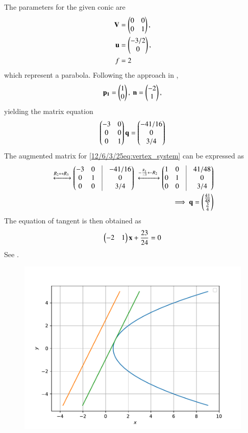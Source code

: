 The parameters for the given conic are
\begin{align}
	\label{12/6/3/25eq:V_matrix}
	\mathbf{V} &= \begin{pmatrix}0 & 0\\0 & 1\end{pmatrix},
	\\
	\label{12/6/3/25eq:u_vector}
	\mathbf{u} &= \begin{pmatrix}-3/2\\0\end{pmatrix},
	\\
	\label{12/6/3/25eq:f_value}
	f &= 2
\end{align}
which represent a parabola. 
Following the approach in 
,
   \begin{align}
     \mathbf{p_1} = \begin{pmatrix}1\\0\end{pmatrix},\
     \mathbf{n} = \begin{pmatrix}-2\\1\end{pmatrix},
    \end{align}
yielding the matrix equation
\begin{align}
	\label{12/6/3/25eq:vertex_system}
	\begin{pmatrix}-3&0\\0& 0\\0& 1\end{pmatrix}\mathbf{q} = \begin{pmatrix}-41/16\\0 \\3/4\end{pmatrix}\\
\end{align}
The augmented matrix for \eqref{12/6/3/25eq:vertex_system} can be expressed as
\begin{align*}
	\xleftrightarrow[]{R_2 \leftrightarrow R_3}\myvec{-3&0&\vrule&-41/16\\0&1&\vrule&0\\0&0&\vrule&3/4}
	\xleftrightarrow[]{-\frac{R_1}{-3} \leftarrow R_2}\myvec{1&0&\vrule&41/48\\0&1&\vrule&0\\0&0&\vrule&3/4}\\
	\implies\vec{q} = \myvec{\frac{41}{48}\\\frac{3}{4}}
\end{align*}
The equation of tangent is then obtained as
\begin{align}
	\begin{pmatrix}-2 & 1\end{pmatrix}\mathbf{x} +\frac{23}{24} = 0 
\end{align}
See  
		.
	\begin{figure}[!h]
		\centering
 \includegraphics[width=\columnwidth]{chapters/12/6/3/25/figs/conic.pdf}
		\caption{}
		\label{fig:12/6/3/25}
  	\end{figure}
